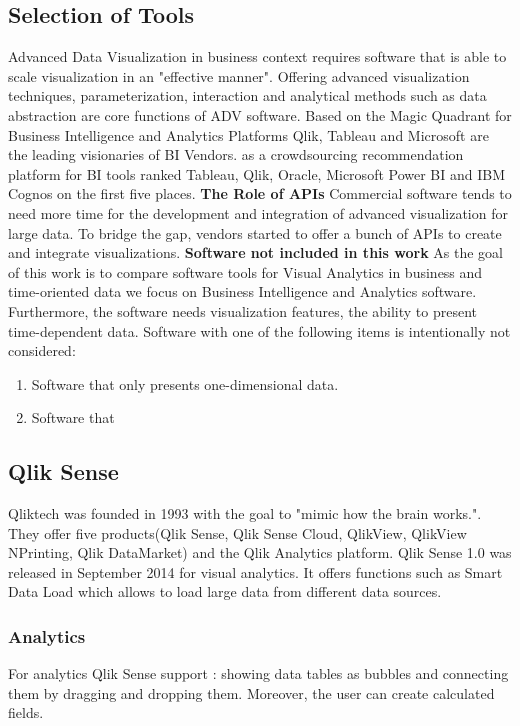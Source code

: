 \subsection{Selection of Tools}
Advanced Data Visualization in business context requires software that is able to scale visualization in an "effective manner"\cite{Russom2011}. Offering advanced visualization techniques, parameterization, interaction and analytical methods such as data abstraction\cite{Tegarden1999,Aigner2011,Eick2002,Zhanga} are core functions of ADV software. Based on the Magic Quadrant for Business Intelligence and Analytics Platforms\cite{Parenteau2016} Qlik, Tableau and Microsoft are the leading visionaries of BI Vendors. \cite{ITCentralStation} as a crowdsourcing recommendation platform for BI tools ranked Tableau, Qlik, Oracle, Microsoft Power BI and IBM Cognos on the first five places.
\textbf{The Role of APIs}
Commercial software tends to need more time for the development and integration of advanced visualization for large data\cite{Zhanga, Simon2014}. To bridge the gap, vendors started to offer a bunch of APIs to create and integrate visualizations.
\textbf{Software not included in this work}
As the goal of this work is to compare software tools %
for Visual Analytics in business and time-oriented data we focus on Business Intelligence and Analytics software. Furthermore, the software needs visualization features, the ability to present time-dependent data. Software with one of the following items is intentionally not considered: 
\begin{enumerate}
    \item Software that only presents one-dimensional data. 
    \item Software that 
\end{enumerate}

\subsection{Qlik Sense}
Qliktech was founded in 1993 with the goal to "mimic how the brain works."\cite{qlikHistory}. They offer five products(Qlik Sense, Qlik Sense Cloud, QlikView, QlikView NPrinting, Qlik DataMarket) and the Qlik Analytics platform. Qlik Sense 1.0 was released in September 2014 for visual analytics. 
It offers functions such as Smart Data Load which allows to load large data from different data sources.
\subsubsection*{Analytics}
For analytics Qlik Sense support : showing data tables as bubbles and connecting them by dragging and dropping them. Moreover, the user can create calculated fields\cite{qlikCalculated}.

